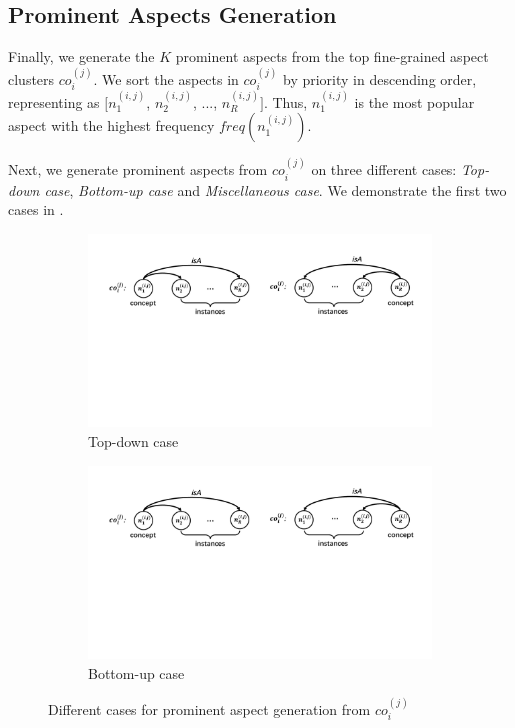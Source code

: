 \subsection{Prominent Aspects Generation}
Finally, we generate the $K$ prominent aspects from 
the top fine-grained aspect clusters $co_i^{(j)}$.
We sort the aspects in $co_i^{(j)}$ by priority in descending
order, representing as 
$[n^{(i,j)}_1$, $n^{(i,j)}_2$, ..., $n^{(i,j)}_R]$.
Thus, $n^{(i,j)}_1$ is the most popular aspect
with the highest frequency $freq(n^{(i,j)}_1)$.

Next, we generate prominent aspects
from $co_i^{(j)}$ on three different cases:
\textit{Top-down case}, \textit{Bottom-up case}
and \textit{Miscellaneous case}.
We demonstrate the first two cases in .


\begin{figure}[!h]
	\centering
	\begin{subfigure}{.5\textwidth}
		\centering
		\includegraphics[width=0.95\linewidth]{figures/gaw}
		\caption{Top-down case}
		\label{fig:case_a}
	\end{subfigure}%
	\begin{subfigure}{.5\textwidth}
		\centering
		\includegraphics[width=0.95\linewidth]{figures/gbw}
		\caption{Bottom-up case}
		\label{fig:case_b}
	\end{subfigure}
	\caption{Different cases for prominent aspect generation from $co_i^{(j)}$}
	\label{fig:cases}
\end{figure}

